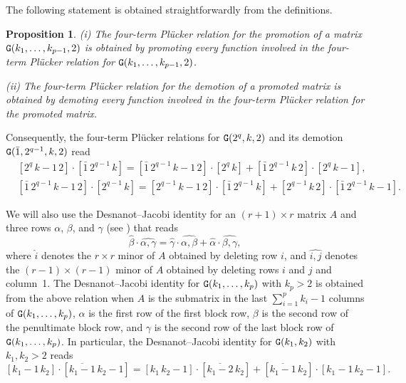 \documentclass{amsart}
\newtheorem{proposition}[theorem]{Proposition}
\theoremstyle{definition}
\theoremstyle{remark}
\numberwithin{equation}{section}
\numberwithin{theorem}{section}
\def\NG{{\tt G}}
\begin{document}
The following statement is obtained straightforwardly from the definitions.

\begin{proposition}\label{promo1}
{\rm (i)} The four-term Pl\"ucker relation for the promotion of a matrix $\NG(k_1,\dots,k_{p-1},2)$ is obtained by promoting every function involved in the four-term Pl\"ucker relation for $\NG(k_1,\dots,k_{p-1},2)$.

{\rm(ii)} The four-term Pl\"ucker relation for the demotion of a promoted matrix is obtained by demoting every function involved in the four-term Pl\"ucker relation for the promoted matrix.
\end{proposition}

Consequently, the four-term Pl\"ucker relations for $\NG(2^q,k,2)$ and its demotion $\NG(\bar1, 2^{q-1},k,2)$ read
\begin{equation}\label{promo4pluck}
\begin{aligned}
&[2^q\,k-1\,2]\cdot[\bar1\, 2^{q-1}\,k]=[\bar1\,2^{q-1}\,k-1\,2]\cdot[2^q\,k]+[\bar1\,2^{q-1}\,k\,2]\cdot[2^q\,k-1],\\
&[\bar1\,2^{q-1}\,k-1\,2]\cdot[2^{q-1}\,k]=[2^{q-1}\,k-1\,2]\cdot[\bar1\,2^{q-1}\,k]+[2^{q-1}\,k\,2]\cdot[\bar1\,2^{q-1}\,k-1].
\end{aligned}
\end{equation}

We will also use the Desnanot--Jacobi identity for an $(r+1)\times r$ matrix $A$ and three rows $\alpha$, $\beta$, and $\gamma$ (see \cite[Eq.~(6.2)]{GSVMem}) that reads
\begin{equation}\label{genDJ}
\widehat{\beta}\cdot\widehat{\alpha,\gamma}=\widehat{\gamma}\cdot\widehat{\alpha,\beta}+\widehat{\alpha}\cdot
\widehat{\beta,\gamma},
\end{equation}
where $\widehat{i}$ denotes the $r\times r$ minor of $A$ obtained by deleting row $i$, and $\widehat{i,j}$ denotes
the $(r-1)\times(r-1)$ minor of $A$ obtained by deleting rows $i$ and $j$ and column~1. The Desnanot--Jacobi identity
for $\NG(k_1,\dots,k_{p})$ with $k_p>2$ is obtained from the above relation when $A$ is the submatrix in the last 
$\sum_{i=1}^p k_i-1$ columns of $\NG(k_1,\dots,k_{p})$,
$\alpha$ is the first row of the first block row, $\beta$ is the second row of the penultimate block row, and $\gamma$ is the second row of the last block row of $\NG(k_1,\dots,k_{p})$. In particular, the Desnanot--Jacobi identity for $\NG(k_1,k_2)$ with $k_1,k_2>2$ reads
\begin{equation}\label{DJ}
[k_1-1\,k_2]\cdot[\overline{k_1-1}\,k_2-1]=[k_1\,k_2-1]\cdot[\overline{k_1-2}\,k_2]+[\overline{k_1-1}\,k_2]
\cdot[k_1-1\,k_2-1].
\end{equation}
\end{document}

